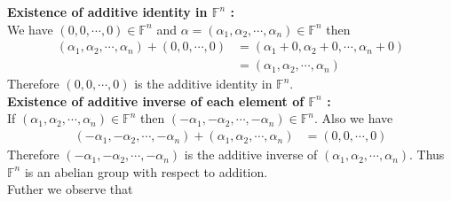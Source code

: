\documentclass[journal,12pt,twocolumn]{IEEEtran}
\begin{document}
{\bf Existence of additive identity in $\mathbb{F}^n$ :} \\
We have $(0,0,\cdots,0) \in \mathbb{F}^n$
and $\alpha=(\alpha_1,\alpha_2,\cdots,\alpha_n) \in \mathbb{F}^n$ then
\begin{align}
	(\alpha_1,\alpha_2,\cdots,\alpha_n)+(0,0,\cdots,0)&=(\alpha_1+0,\alpha_2+0,\cdots,\alpha_n+0) \\
	&=(\alpha_1,\alpha_2,\cdots,\alpha_n) 
\end{align}
Therefore $(0,0,\cdots,0)$ is the additive identity in $\mathbb{F}^n$.\\
{\bf Existence of additive inverse of each element of $\mathbb{F}^n$ :} \\
If $(\alpha_1,\alpha_2,\cdots,\alpha_n) \in \mathbb{F}^n$ then $(-\alpha_1,-\alpha_2,\cdots,-\alpha_n)
\in \mathbb{F}^n$. Also we have
\begin{align}
	(-\alpha_1,-\alpha_2,\cdots,-\alpha_n)+(\alpha_1,\alpha_2,\cdots,\alpha_n)&=(0,0,\cdots,0)
\end{align}
Therefore $(-\alpha_1,-\alpha_2,\cdots,-\alpha_n)$ is the additive inverse of $(\alpha_1,\alpha_2,\cdots,\alpha_n)$.
Thus $\mathbb{F}^n$ is an abelian group with respect to addition. \\
\vfill
Futher we observe that
\end{document}
